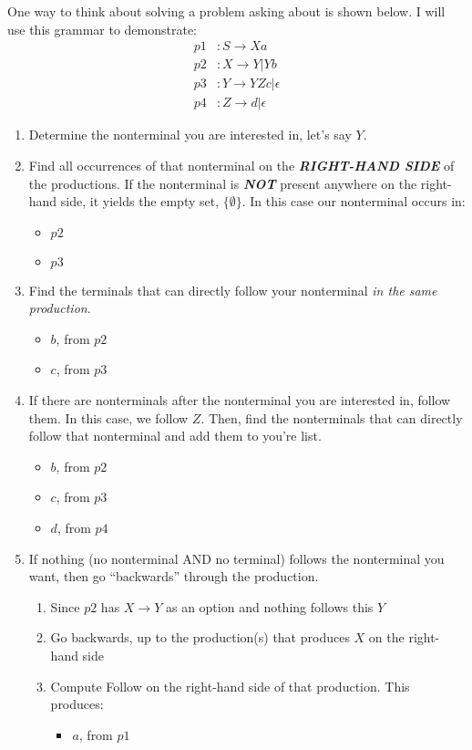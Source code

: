 \begin{blackbox}
  One way to think about solving a problem asking about  is shown below. I will use this grammar to demonstrate:
  \begin{align*}
    p1&: S \rightarrow Xa \\
    p2&: X \rightarrow Y \vert Yb \\
    p3&: Y \rightarrow YZc \vert \epsilon \\
    p4&: Z \rightarrow d \vert \epsilon
  \end{align*}
  \begin{enumerate}[noitemsep]
  \item Determine the nonterminal you are interested in, let's say $Y$.
  \item Find all occurrences of that nonterminal on the \textbf{\emph{RIGHT-HAND SIDE}} of the productions.
    If the nonterminal is \textbf{\emph{NOT}} present anywhere on the right-hand side, it yields the empty set, $\lbrace \emptyset \rbrace$.
    In this case our nonterminal occurs in:
    \begin{itemize}[noitemsep]
    \item $p2$
    \item $p3$
    \end{itemize}
  \item Find the terminals that can directly follow your nonterminal \textit{in the same production}.
    \begin{itemize}[noitemsep]
    \item $b$, from $p2$
    \item $c$, from $p3$
    \end{itemize}
  \item If there are nonterminals after the nonterminal you are interested in, follow them.
    In this case, we follow $Z$.
    Then, find the nonterminals that can directly follow that nonterminal and add them to you're list.
    \begin{itemize}[noitemsep]
    \item $b$, from $p2$
    \item $c$, from $p3$
    \item $d$, from $p4$
    \end{itemize}
  \item If nothing (no nonterminal AND no terminal) follows the nonterminal you want, then go ``backwards'' through the production.
    \begin{enumerate}[noitemsep]
    \item Since $p2$ has $X \rightarrow Y$ as an option and nothing follows this $Y$
    \item Go backwards, up to the production(s) that produces $X$ on the right-hand side
    \item Compute Follow on the right-hand side of that production.
      This produces:
      \begin{itemize}[noitemsep]
      \item $a$, from $p1$
      \end{itemize}
    \end{enumerate}
  \end{enumerate}


\end{blackbox}
